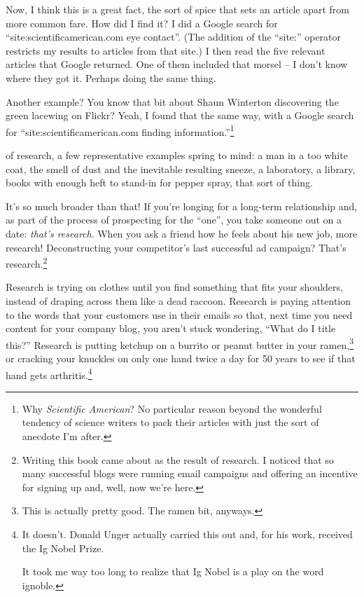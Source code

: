 Now, I think this is a great fact, the sort of spice that sets an article apart from more common fare. How did I find it? I did a Google search for ``site:scientificamerican.com eye contact''. (The addition of the ``site:'' operator restricts my results to articles from that site.) I then read the five relevant articles that Google returned. One of them included that morsel -- I don't know where they got it. Perhaps doing the same thing.

Another example? You know that bit about Shaun Winterton discovering the green
lacewing on Flickr? Yeah, I found that the same way, with a Google search for
``site:scientificamerican.com finding information.''\footnote{Why
  \textit{Scientific American}? No particular reason beyond the wonderful
  tendency of science writers to pack their articles with just the sort of
  anecdote I'm after.}

 of research, a few representative examples spring
to mind: a man in a too white coat, the smell of dust and the inevitable resulting
sneeze, a laboratory, a library, books with enough heft to stand-in for pepper spray, that sort
of thing.

It's so much broader than that! If you're longing for a long-term relationship
and, as part of the process of prospecting for the ``one'', you take someone out on a date: \textit{that's
  research}. When you ask a friend how he feels about his new job, more
research! Deconstructing your competitor's last successful ad campaign? That's
research.\footnote{Writing this book came about as the result of research. I
  noticed that so many successful blogs were running email campaigns and
  offering an incentive for signing up and, well, now we're here.}

Research is trying on clothes until you find something that fits your shoulders,
instead of draping across them like a dead raccoon. Research is paying attention
to the words that your customers use in their emails so that, next time you need
content for your company blog, you aren't stuck wondering, ``What do I title
this?'' Research is putting ketchup on a burrito or peanut butter in your
ramen,\footnote{This is actually pretty good. The ramen bit, anyways.} or cracking your knuckles on only one
hand twice a day for 50 years to see if that hand gets arthritis.\footnote{It
  doesn't. Donald Unger actually carried this out and, for his work, received the
  Ig Nobel Prize.

  It took me way too long to realize that Ig Nobel is a play on the word ignoble.}

